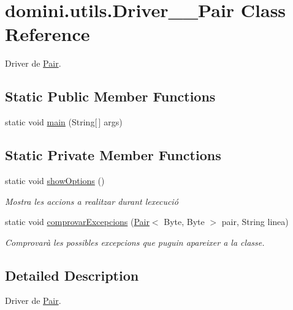 \hypertarget{classdomini_1_1utils_1_1Driver____Pair}{}\section{domini.\+utils.\+Driver\+\_\+\+\_\+\+Pair Class Reference}
\label{classdomini_1_1utils_1_1Driver____Pair}


Driver de \hyperlink{classdomini_1_1utils_1_1Pair}{Pair}.  


\subsection*{Static Public Member Functions}
\begin{DoxyCompactItemize}
\item 
static void \hyperlink{classdomini_1_1utils_1_1Driver____Pair_a6f6dda90b506c692dd03c4fc174550b7}{main} (String\mbox{[}$\,$\mbox{]} args)
\end{DoxyCompactItemize}
\subsection*{Static Private Member Functions}
\begin{DoxyCompactItemize}
\item 
static void \hyperlink{classdomini_1_1utils_1_1Driver____Pair_a97596378f21ba4ab9c0c4ccb4041425b}{show\+Options} ()
\begin{DoxyCompactList}\small\item\em Mostra les accions a realitzar durant l\textquotesingle{}execució \end{DoxyCompactList}\item 
static void \hyperlink{classdomini_1_1utils_1_1Driver____Pair_a640e07e7811e0b56a99ca1afb7e16b65}{comprovar\+Excepcions} (\hyperlink{classdomini_1_1utils_1_1Pair}{Pair}$<$ Byte, Byte $>$ pair, String linea)
\begin{DoxyCompactList}\small\item\em Comprovarà les possibles excepcions que puguin apareixer a la classe. \end{DoxyCompactList}\end{DoxyCompactItemize}


\subsection{Detailed Description}
Driver de \hyperlink{classdomini_1_1utils_1_1Pair}{Pair}. 

